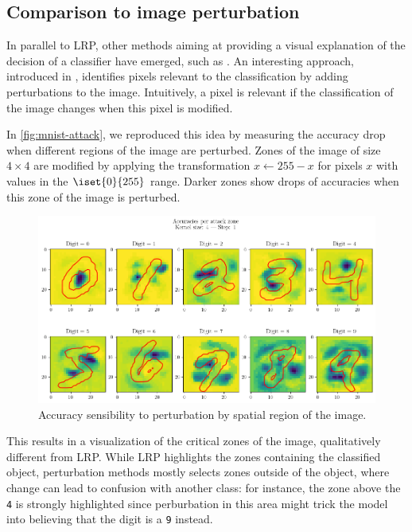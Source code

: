 \documentclass[twocolumn]{../cs-classes/cs-classes}
\newcommand*{\1}{\digitsbb{1}}
\newcommand*{\0}{\digitsbb{0}}
\begin{document}
\subsection{Comparison to image perturbation}
In parallel to LRP, other methods aiming at providing a visual explanation of the decision of a classifier have emerged, such as \cite{inverting,visualizing-cnn}. An interesting approach, introduced in \cite{fong2017interpretable}, identifies pixels relevant to the classification by adding perturbations to the image. Intuitively, a pixel is relevant if the classification of the image changes when this pixel is modified. 

In \autoref{fig:mnist-attack}, we reproduced this idea by measuring the accuracy drop when different regions of the image are perturbed. Zones of the image of size $4\times4$ are modified by applying the transformation $x\longleftarrow255-x$ for pixels $x$ with values in the $\iset{0}{255}$ range. Darker zones show drops of accuracies when this zone of the image is perturbed.
\begin{figure}[H]
    \centering
    \includegraphics[width=\linewidth]{attacks.png}
    \caption{Accuracy sensibility to perturbation by spatial region of the image. }
    \label{fig:mnist-attack}
\end{figure}
This results in a visualization of the critical zones of the image, qualitatively different from LRP. While LRP highlights the zones containing the classified object, perturbation methods mostly selects zones outside of the object, where change can lead to confusion with another class: for instance, the zone above the \texttt{4} is strongly highlighted since perburbation in this area might trick the model into believing that the digit is a \texttt{9} instead.
\end{document}
